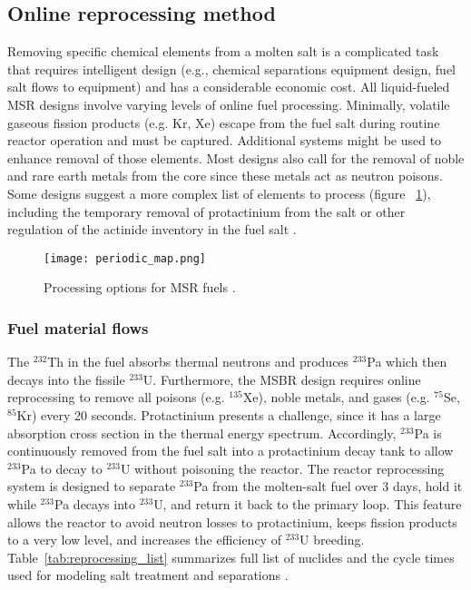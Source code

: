 \subsection{Online reprocessing method}
Removing specific chemical elements from a molten salt is a complicated task that requires intelligent design (e.g., chemical separations equipment design, fuel salt flows to equipment) and has a considerable economic cost. All liquid-fueled \gls{MSR} designs involve varying levels of online fuel processing. Minimally, volatile gaseous fission products (e.g. Kr, Xe) escape from the fuel salt during routine reactor operation and must be captured. Additional systems might be used to enhance removal of those elements. Most designs also call for the removal of noble and rare earth metals from the core since these metals act as neutron poisons. Some designs suggest a more complex list of elements to process (figure ~\ref{fig:periodic_tab}), including the temporary removal of protactinium from the salt or other regulation of the actinide inventory in the fuel salt \cite{ahmad_neutronics_2015}.

\begin{figure}[htp!] %
  \centering
  \texttt{[image: periodic\_map.png]}
  \caption{Processing options for \gls{MSR} fuels \cite{ahmad_neutronics_2015}.}
  \label{fig:periodic_tab}
\end{figure}

\subsubsection{Fuel material flows}
The $^{232}$Th in the fuel absorbs thermal neutrons and produces $^{233}$Pa which then decays into the fissile $^{233}$U. Furthermore, the \gls{MSBR} design requires online reprocessing to remove all poisons (e.g. $^{135}$Xe), noble metals, and gases (e.g. $^{75}$Se, $^{85}$Kr) every 20 seconds. Protactinium presents a challenge, since it has a large absorption cross section in the thermal energy spectrum. Accordingly, $^{233}$Pa is continuously removed from the fuel salt into a protactinium decay tank to allow $^{233}$Pa to decay to $^{233}$U without poisoning the reactor. The reactor reprocessing system is designed to separate $^{233}$Pa from the molten-salt fuel over 3 days, hold it while $^{233}$Pa decays into $^{233}$U, and return it back to the primary loop. This feature allows the reactor to avoid neutron losses to protactinium, keeps fission products to a very low level, and increases the efficiency of $^{233}$U breeding. Table~\ref{tab:reprocessing_list} summarizes full list of nuclides and the cycle times used for modeling salt treatment and separations \cite{robertson_conceptual_1971}. 

